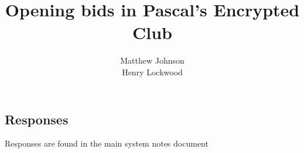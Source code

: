 \documentclass[a4paper,14pt]{extarticle}
\author{Matthew Johnson\\Henry Lockwood}
\title{Opening bids in Pascal's Encrypted Club}
\begin{document}
\setcounter{section}{2}
\setcounter{subsection}{2}



\subsection{Responses}
Responses are found in the main system notes document
\label{sec:resp:1level}
\label{sec:resp:1nnat}
\label{sec:resp:2level}
\label{sec:resp:higher}
\end{document}

